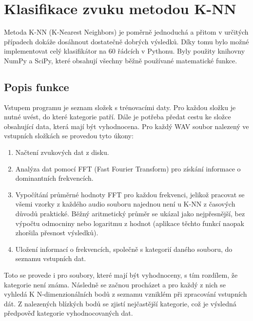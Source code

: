 \documentclass[a4paper,11pt]{article}
\begin{document}
		\section{Klasifikace zvuku metodou K-NN}
			Metoda K-NN (K-Nearest Neighbors) je poměrně jednoduchá a přitom v určitých případech dokáže dosáhnout dostatečně dobrých výsledků. Díky tomu bylo možné implementovat celý klasifikátor na 60 řádcích v Pythonu. Byly použity knihovny NumPy a SciPy, které obsahují všechny běžně používané matematické funkce.
			
			\subsection{Popis funkce}
				Vstupem programu je seznam složek s trénovacími daty. Pro každou složku je nutné uvést, do které kategorie patří. Dále je potřeba předat cestu ke složce obsahující data, která mají být vyhodnocena.
				Pro každý WAV soubor nalezený ve vstupních složkách se provedou tyto úkony:
				
				\begin{enumerate}
					\item Načtení zvukových dat z disku.
					\item Analýza dat pomocí FFT (Fast Fourier Transform) pro získání informace o dominantních frekvencích.
					\item Vypočítání průměrné hodnoty FFT pro každou frekvenci, jelikož pracovat se všemi vzorky z každého audio souboru najednou není u K-NN z časových důvodů praktické. Běžný aritmetický průměr se ukázal jako nejpřesnější, bez výpočtu odmocniny nebo logaritmu z hodnot (aplikace těchto funkcí naopak zhoršila přesnost výsledků).
					\item Uložení informací o frekvencích, společně s kategorií daného souboru, do seznamu vstupních dat.
				\end{enumerate}
			
				Toto se provede i pro soubory, které mají být vyhodnoceny, s tím rozdílem, že kategorie není známa. Následně se začnou procházet a pro každý z nich se vyhledá K N-dimenzionálních bodů z seznamu vzniklém při zpracování vstupních dát. Z nalezených blízkých bodů se zjistí nejčastější kategorie, což je výsledná předpověď kategorie vyhodnocovaných dat.
				
\end{document}
